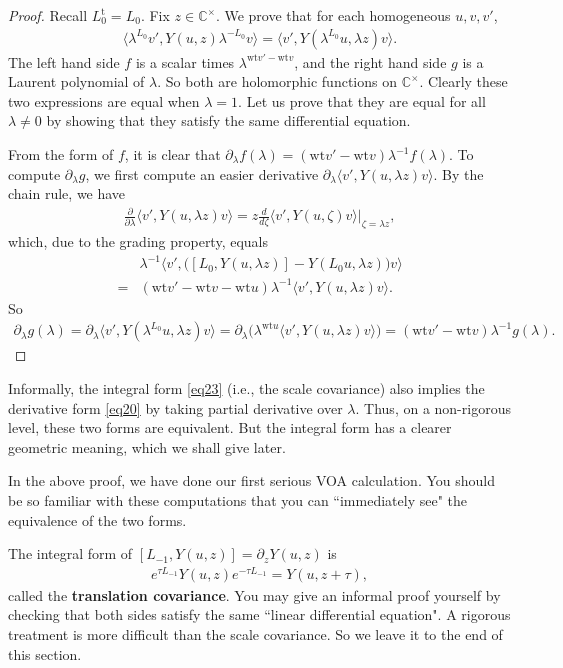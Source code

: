 \documentclass[11pt,b5paper,notitlepage]{article}
\theoremstyle{definition}
\theoremstyle{plain}
\newcommand{\tr}{\mathrm{t}} %
\newcommand{\bk}[1]{\langle {#1}\rangle}
\newcommand{\bigbk}[1]{\big\langle {#1}\big\rangle}
\newcommand{\Bigbk}[1]{\Big\langle {#1}\Big\rangle}
\newcommand{\Cbb}{\mathbb C}
\newcommand{\wt}{\mathrm{wt}}
\numberwithin{equation}{section}
\begin{document}
\begin{proof}
Recall $L_0^\tr=L_0$. Fix $z\in\Cbb^\times$. We prove that for each homogeneous $u,v,v'$,
\begin{align}
\bk{\lambda^{L_0}v',Y(u,z)\lambda^{-L_0}v}	=\bk{v',Y(\lambda^{L_0}u,\lambda z)v}.
\end{align}	
The left hand side $f$ is a scalar times $\lambda^{\wt v'-\wt v}$, and the right hand side $g$ is a Laurent polynomial of $\lambda$. So both are holomorphic functions on $\Cbb^\times$. Clearly these two expressions are equal when $\lambda=1$. Let us prove that they are equal for all $\lambda\neq 0$ by showing that they satisfy the same differential equation.

From the form of $f$, it is clear that $\partial_\lambda f(\lambda)=(\wt v'-\wt v)\lambda^{-1}f(\lambda)$. To compute $\partial_\lambda g$, we first  compute an easier derivative $\partial_\lambda\bk {v',Y(u,\lambda z)v}$. By the chain rule, we have
\begin{align*}
	\frac\partial{\partial\lambda} \bk{v',Y(u,\lambda z)v}=	z\frac d{d\zeta}\bk{v',Y(u,\zeta)v}\Big|_{\zeta=\lambda z},
\end{align*}
which, due to the grading property, equals 
\begin{align*}
&\lambda^{-1}\Bigbk{v',\big([L_0,Y(u,\lambda z)]-Y(L_0u,\lambda z)\big)v}\\
=&(\wt v'-\wt v-\wt u)\lambda^{-1}\bigbk{v',Y(u,\lambda z)v}.
\end{align*}
So
\begin{align*}
\partial_\lambda g(\lambda)=\partial_\lambda \bigbk{v',Y(\lambda^{L_0}u,\lambda z)v}=	\partial_\lambda \big(\lambda^{\wt u}\bigbk{v',Y(u,\lambda z)v}\big)=(\wt v'-\wt v)\lambda^{-1}g(\lambda).
\end{align*}
\end{proof}




Informally, the integral form \eqref{eq23} (i.e., the scale covariance) also implies the derivative form \eqref{eq20} by taking partial derivative over $\lambda$. Thus, on a non-rigorous level, these two forms are equivalent. But the integral form has a clearer geometric meaning, which we shall give later.


In the above proof, we have done our first serious VOA calculation. You should be so familiar with these computations that you can ``immediately see" the equivalence of the two forms.


The integral form of $[L_{-1},Y(u,z)]=\partial_z Y(u,z)$ is
\begin{align*}
e^{\tau L_{-1}}Y(u,z)e^{-\tau L_{-1}}=Y(u,z+\tau),
\end{align*}
called the \textbf{translation covariance}. You may give an informal proof yourself by checking that both sides satisfy the same ``linear differential equation". A rigorous treatment is more difficult than the scale covariance. So we leave it to the end of this section.
\end{document}
